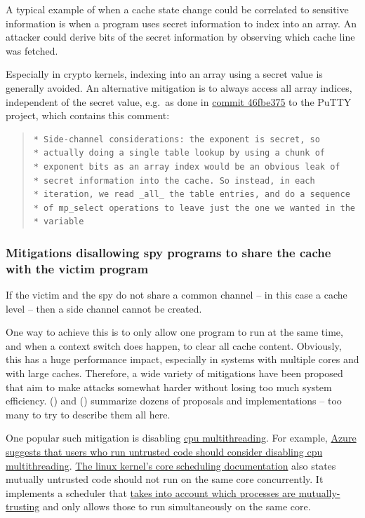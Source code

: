 \documentclass[
  a4paper,
]{report}
\begin{document}
A typical example of when a cache state change could be correlated to
sensitive information is when a program uses secret information to index
into an array. An attacker could derive bits of the secret information
by observing which cache line was fetched.

Especially in crypto kernels, indexing into an array using a secret
value is generally avoided. An alternative mitigation is to always
access all array indices, independent of the secret value, e.g.~as done
in
\href{https://git.tartarus.org/?p=simon/putty.git;a=commitdiff;h=46fbe375bf}{commit
46fbe375} to the PuTTY project, which contains this comment:

\begin{quote}
\begin{verbatim}
* Side-channel considerations: the exponent is secret, so
* actually doing a single table lookup by using a chunk of
* exponent bits as an array index would be an obvious leak of
* secret information into the cache. So instead, in each
* iteration, we read _all_ the table entries, and do a sequence
* of mp_select operations to leave just the one we wanted in the
* variable
\end{verbatim}
\end{quote}

\subsubsection{Mitigations disallowing spy programs to share the cache
with the victim
program}\label{mitigations-disallowing-spy-programs-to-share-the-cache-with-the-victim-program}

If the victim and the spy do not share a common channel -- in this case
a cache level -- then a side channel cannot be created.

One way to achieve this is to only allow one program to run at the same
time, and when a context switch does happen, to clear all cache content.
Obviously, this has a huge performance impact, especially in systems
with multiple cores and with large caches. Therefore, a wide variety of
mitigations have been proposed that aim to make attacks somewhat harder
without losing too much system efficiency.
() and
() summarize dozens of proposals
and implementations -- too many to try to describe them all here.

One popular such mitigation is disabling
\href{https://en.wikipedia.org/wiki/Multithreading_(computer_architecture)}{\label{__index_entry_138}{cpu
multithreading}}. For example,
\href{https://learn.microsoft.com/en-us/azure/virtual-machines/mitigate-se}{Azure
suggests that users who run untrusted code should consider disabling cpu
multithreading}.
\href{https://www.kernel.org/doc/Documentation/admin-guide/hw-vuln/core-scheduling.rst}{The
linux kernel's core scheduling documentation} also states mutually
untrusted code should not run on the same core concurrently. It
implements a scheduler that
\href{https://lwn.net/Articles/861251/}{takes into account which
processes are mutually-trusting} and only allows those to run
simultaneously on the same core.
\end{document}
